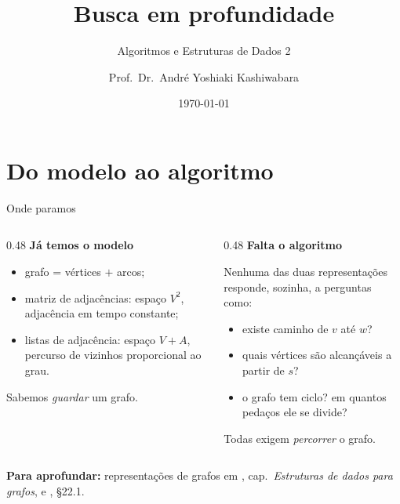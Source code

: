 \documentclass[aspectratio=169]{beamer}
\title{Busca em profundidade}
\subtitle{Algoritmos e Estruturas de Dados 2}
\author[André Y. Kashiwabara <andreyoshiaki@dcomp.ufs.br>]{Prof.\ Dr.\ André Yoshiaki Kashiwabara}
\institute{Departamento de Computação --- Universidade Federal de Sergipe}
\date{\today}
\newcommand{\fonte}[1]{%
  \vfill
  {\tiny\color{gray!55!black}\textbf{Para aprofundar:} #1\par}%
}
\begin{document}
\begin{frame}
  \titlepage
\end{frame}

\section{Do modelo ao algoritmo}

\begin{frame}{Onde paramos}
  \begin{columns}[T]
    \begin{column}{0.48\textwidth}
      \textbf{Já temos o modelo}

      \medskip
      {\small
      \begin{itemize}\scriptsize
        \item grafo = vértices $+$ arcos;
        \item matriz de adjacências: espaço $V^2$, adjacência em tempo constante;
        \item listas de adjacência: espaço $V+A$, percurso de vizinhos
              proporcional ao grau.
      \end{itemize}
      Sabemos \emph{guardar} um grafo.}
    \end{column}
    \begin{column}{0.48\textwidth}
      \textbf{Falta o algoritmo}

      \medskip
      {\small
      Nenhuma das duas representações responde, sozinha, a perguntas como:
      \begin{itemize}\scriptsize
        \item existe caminho de $v$ até $w$?
        \item quais vértices são alcançáveis a partir de $s$?
        \item o grafo tem ciclo? em quantos pedaços ele se divide?
      \end{itemize}
      Todas exigem \emph{percorrer} o grafo.}
    \end{column}
  \end{columns}
  \fonte{representações de grafos em \cite{feofiloff2020algoritmos}, cap.\
  \emph{Estruturas de dados para grafos}, e \cite{cormen2009introduction}, §22.1.}
\end{frame}
\end{document}
